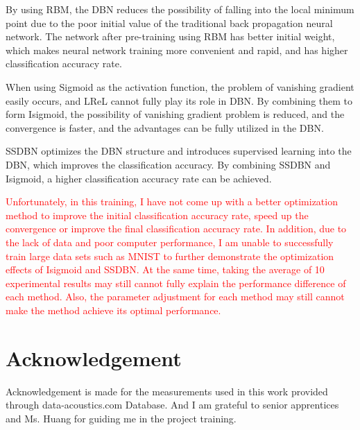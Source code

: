 \documentclass{modified}
\begin{document}
By using RBM, the DBN reduces the possibility of falling into the local minimum point due to the poor initial value of the traditional back propagation neural network. The network after pre-training using RBM has better initial weight, which makes neural network training more convenient and rapid, and has higher classification accuracy rate.

When using Sigmoid as the activation function, the problem of vanishing gradient easily occurs, and LReL cannot fully play its role in DBN. By combining them to form Isigmoid, the possibility of vanishing gradient problem is reduced, and the convergence is faster, and the advantages can be fully utilized in the DBN.

SSDBN optimizes the DBN structure and introduces supervised learning into the DBN, which improves the classification accuracy. By combining SSDBN and Isigmoid, a higher classification accuracy rate can be achieved.

\textcolor{red}{Unfortunately, in this training, I have not come up with a better optimization method to improve the initial classification accuracy rate, speed up the convergence or improve the final classification accuracy rate. In addition, due to the lack of data and poor computer performance, I am unable to successfully train large data sets such as MNIST to further demonstrate the optimization effects of Isigmoid and SSDBN. At the same time, taking the average of 10 experimental results may still cannot fully explain the performance difference of each method. Also, the parameter adjustment for each method may still cannot make the method achieve its optimal performance.}


\section*{Acknowledgement}
Acknowledgement is made for the measurements used in this work provided through data-acoustics.com Database. And I am grateful to senior apprentices and Ms. Huang for guiding me in the project training.




 
\end{document}
